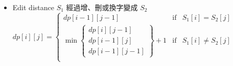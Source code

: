 \begin{itemize}

\item Edit distance
    \subitem $S_1$ 經過增、刪或換字變成 $S_2$
    \subitem $dp[i][j] = \left \{
        \begin{array}{lrc}
            dp[i-1][j-1] & \mbox{if} & S_1[i] = S_2[j] \\
            \min\left \{
                \begin{array}{c}
                    dp[i][j-1] \\ dp[i-1][j] \\ dp[i-1][j-1]
                \end{array}\right \}+1 & \mbox{if} & S_1[i] \neq S_2[j] \\
        \end{array}\right .$
\end{itemize}